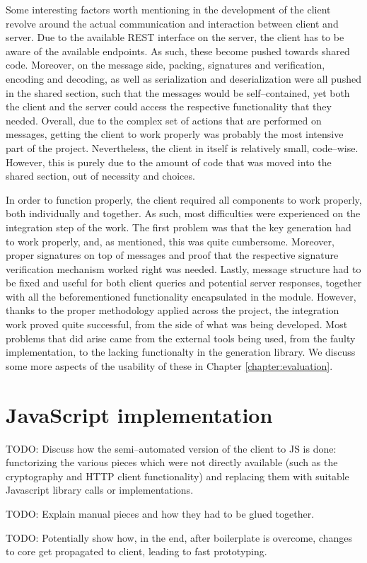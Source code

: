 Some interesting factors worth mentioning in the development of the client revolve around the actual communication and interaction between client and server.
Due to the available REST interface on the server, the client has to be aware of the available endpoints.
As such, these become pushed towards shared code.
Moreover, on the message side, packing, signatures and verification, encoding and decoding, as well as serialization and deserialization were all pushed in the shared section, such that the messages would be self--contained, yet both the client and the server could access the respective functionality that they needed.
Overall, due to the complex set of actions that are performed on messages, getting the client to work properly was probably the most intensive part of the project.
Nevertheless, the client in itself is relatively small, code--wise.
However, this is purely due to the amount of code that was moved into the shared section, out of necessity and choices.

In order to function properly, the client required all components to work properly, both individually and together.
As such, most difficulties were experienced on the integration step of the work.
The first problem was that the  key generation had to work properly, and, as mentioned, this was quite cumbersome.
Moreover, proper  signatures on top of messages and proof that the respective signature verification mechanism worked right was needed.
Lastly, message structure had to be fixed and useful for both client queries and potential server responses, together with all the beforementioned functionality encapsulated in the  module.
However, thanks to the proper methodology applied across the project, the integration work proved quite successful, from the side of what was being developed.
Most problems that did arise came from the external tools being used, from the faulty  implementation, to the lacking functionalty in the  generation library.
We discuss some more aspects of the usability of these in Chapter \ref{chapter:evaluation}.

\section{JavaScript implementation}
TODO: Discuss how the semi--automated version of the client to JS is done: functorizing the various pieces which were not directly available (such as the cryptography and HTTP client functionality) and replacing them with suitable Javascript library calls or implementations.

TODO: Explain manual pieces and how they had to be glued together.

TODO: Potentially show how, in the end, after boilerplate is overcome, changes to core get propagated to client, leading to fast prototyping.

